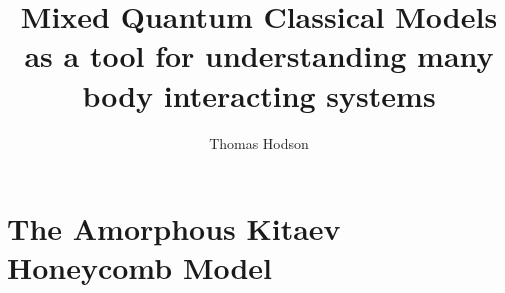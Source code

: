 \documentclass[a4paper,12pt]{report}
\begin{document}
\title{\LARGE {\bf Mixed Quantum Classical Models as a tool for understanding many body interacting systems}\\
 \vspace*{6mm}
}

\author{Thomas Hodson}

\normallinespacing
\maketitle

\preface
% 


\body
%     

%     

\chapter{The Amorphous Kitaev Honeycomb Model}
\label{ch:kitaev_model}
    

%     

%     



\end{document}
